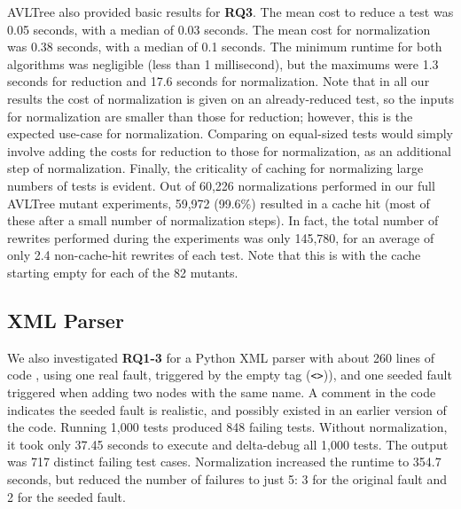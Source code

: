 AVLTree also provided basic results for {\bf RQ3}. The mean cost to reduce a
test was 0.05 seconds, with a median of 0.03 seconds.  The mean
cost for normalization was 0.38 seconds, with a median of 0.1 seconds.
The minimum runtime for both algorithms was negligible (less than 1
millisecond), but the maximums were 1.3 seconds for reduction and 17.6
seconds for normalization.  Note that in all our results the cost of
normalization is given on an already-reduced test, so the inputs
for normalization are smaller than those for reduction; however, this
is the expected use-case for normalization.  Comparing on equal-sized
tests would simply involve adding the costs for reduction to those for
normalization, as an additional step of normalization.  Finally, the
criticality of caching for normalizing large numbers of tests is
evident.  Out of 60,226 normalizations performed in our full AVLTree mutant
experiments, 59,972 (99.6\%) resulted in a cache hit (most of these
after a small number of normalization steps).  In fact, the total
number of rewrites performed during the experiments was only 145,780,
for an average of only 2.4 non-cache-hit rewrites of each test.  Note
that this is with the cache starting empty for each of the 82 mutants.

\subsection{XML Parser}

We also investigated {\bf RQ1-3} for a
Python XML parser with about 260 lines of code \cite{myxml}, using one
real fault, triggered by the empty tag ({\tt <>})), and one
seeded fault triggered when adding two nodes with the same
name.  A comment in the code indicates the seeded fault is realistic,
and possibly existed in an earlier version of the code.  Running 1,000 tests
produced 848 failing tests.  Without normalization, it took only
37.45 seconds to execute and delta-debug all 1,000 tests.  The output was 717 distinct failing test
cases.  Normalization increased the runtime to 354.7 seconds, but
reduced the number of failures to just 5: 3 
for the original fault and 2 for the seeded fault.

